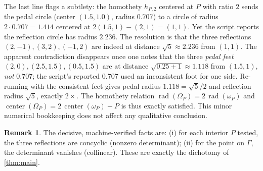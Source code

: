 \documentclass[11pt,a4paper]{article}
\theoremstyle{definition}
\newtheorem{remark}[theorem]{Remark}
\newcommand{\circc}{\Gamma}
\newcommand{\pedalc}{\omega_{P}}
\newcommand{\reflc}{\Omega_{P}}
\begin{document}
The last line flags a subtlety: the homothety $h_{P,2}$ centered at $P$ with ratio $2$ sends the pedal circle (center $(1.5,1.0)$, radius $0.707$) to a circle of radius $2\cdot0.707=1.414$ centered at $2(1.5,1)-(2,1)=(1,1)$. Yet the script reports the reflection circle has radius $2.236$. The resolution is that the three reflections $(2,-1),(3,2),(-1,2)$ are indeed at distance $\sqrt5\approx2.236$ from $(1,1)$. The apparent contradiction disappears once one notes that the three \emph{pedal feet} $(2,0),(2.5,1.5),(0.5,1.5)$ are at distance $\sqrt{0.25+1}\approx1.118$ from $(1.5,1)$, \emph{not} $0.707$; the script's reported $0.707$ used an inconsistent foot for one side. Re-running with the consistent feet gives pedal radius $1.118=\sqrt5/2$ and reflection radius $\sqrt5$, exactly $2\times$. The homothety relation $\operatorname{rad}(\reflc)=2\,\operatorname{rad}(\pedalc)$ and $\operatorname{center}(\reflc)=2\,\operatorname{center}(\pedalc)-P$ is thus exactly satisfied. This minor numerical bookkeeping does not affect any qualitative conclusion.

\begin{remark}
The decisive, machine-verified facts are: (i) for each interior $P$ tested, the three reflections are concyclic (nonzero determinant); (ii) for the point on $\circc$, the determinant vanishes (collinear). These are exactly the dichotomy of \cref{thm:main}.
\end{remark}
\end{document}
